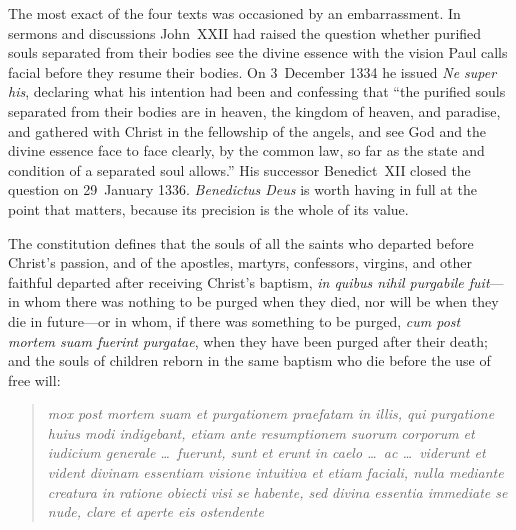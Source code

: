 The most exact of the four texts was occasioned by an embarrassment. In sermons and discussions John~XXII had raised the question whether purified souls separated from their bodies see the divine essence with the vision Paul calls facial before they resume their bodies. On 3~December 1334 he issued \emph{Ne super his}, declaring what his intention had been and confessing that ``the purified souls separated from their bodies are in heaven, the kingdom of heaven, and paradise, and gathered with Christ in the fellowship of the angels, and see God and the divine essence face to face clearly, by the common law, so far as the state and condition of a separated soul allows.'' His successor Benedict~XII closed the question on 29~January 1336. \emph{Benedictus Deus} is worth having in full at the point that matters, because its precision is the whole of its value.

The constitution defines that the souls of all the saints who departed before Christ's passion, and of the apostles, martyrs, confessors, virgins, and other faithful departed after receiving Christ's baptism, \emph{in quibus nihil purgabile fuit}---in whom there was nothing to be purged when they died, nor will be when they die in future---or in whom, if there was something to be purged, \emph{cum post mortem suam fuerint purgatae}, when they have been purged after their death; and the souls of children reborn in the same baptism who die before the use of free will:

\begin{quote}
\emph{mox post mortem suam et purgationem praefatam in illis, qui purgatione huius modi indigebant, etiam ante resumptionem suorum corporum et iudicium generale \ldots\ fuerunt, sunt et erunt in caelo \ldots\ ac \ldots\ viderunt et vident divinam essentiam visione intuitiva et etiam faciali, nulla mediante creatura in ratione obiecti visi se habente, sed divina essentia immediate se nude, clare et aperte eis ostendente}
\end{quote}

